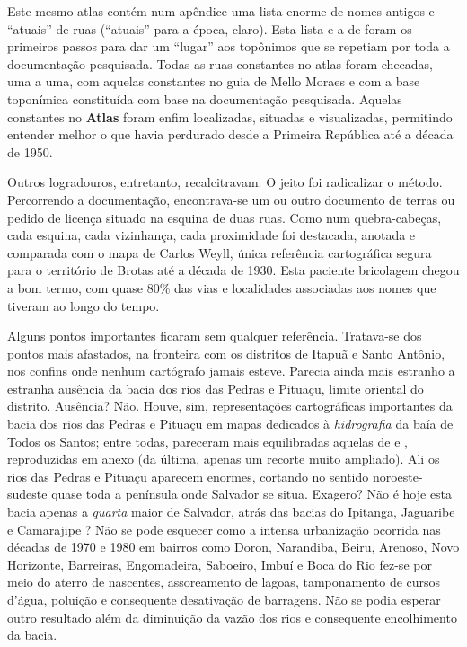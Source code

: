 Este mesmo atlas contém num apêndice uma lista enorme de nomes antigos e ``atuais'' de ruas (``atuais'' para a época, claro). Esta lista e a de  foram os primeiros passos para dar um ``lugar'' aos topônimos que se repetiam por toda a documentação pesquisada. Todas as ruas constantes no atlas foram checadas, uma a uma, com aquelas constantes no guia de Mello Moraes e com a base toponímica constituída com base na documentação pesquisada. Aquelas constantes no \textbf{Atlas} foram enfim localizadas, situadas e visualizadas, permitindo entender melhor o que havia perdurado desde a Primeira República até a década de 1950.

Outros logradouros, entretanto, recalcitravam. O jeito foi radicalizar o método. Percorrendo a documentação, encontrava-se um ou outro documento de terras ou pedido de licença situado na esquina de duas ruas. Como num quebra-cabeças, cada esquina, cada vizinhança, cada proximidade foi destacada, anotada e comparada com o mapa de Carlos Weyll, única referência cartográfica segura para o território de Brotas até a década de 1930. Esta paciente bricolagem chegou a bom termo, com quase 80\% das vias e localidades associadas aos nomes que tiveram ao longo do tempo.

Alguns pontos importantes ficaram sem qualquer referência. Tratava-se dos pontos mais afastados, na fronteira com os distritos de Itapuã e Santo Antônio, nos confins onde nenhum cartógrafo jamais esteve. Parecia ainda mais estranho a estranha ausência da bacia dos rios das Pedras e Pituaçu, limite oriental do distrito. Ausência? Não. Houve, sim, representações cartográficas importantes da bacia dos rios das Pedras e Pituaçu em mapas dedicados à \textit{hidrografia} da baía de Todos os Santos; entre todas, pareceram mais equilibradas aquelas de  e , reproduzidas em anexo (da última, apenas um recorte muito ampliado). Ali os rios das Pedras e Pituaçu aparecem enormes, cortando no sentido noroeste-sudeste quase toda a península onde Salvador se situa. Exagero? Não é hoje esta bacia apenas a \textit{quarta} maior de Salvador, atrás das bacias do Ipitanga, Jaguaribe e Camarajipe \cite{santos_aguas_2010}? Não se pode esquecer como a intensa urbanização ocorrida nas décadas de 1970 e 1980 em bairros como Doron, Narandiba, Beiru, Arenoso, Novo Horizonte, Barreiras, Engomadeira, Saboeiro, Imbuí e Boca do Rio fez-se por meio do aterro de nascentes, assoreamento de lagoas, tamponamento de cursos d'água, poluição e consequente desativação de barragens. Não se podia esperar outro resultado além da diminuição da vazão dos rios e consequente encolhimento da bacia.


